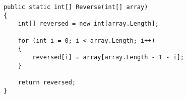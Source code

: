 \begin{lstlisting}
public static int[] Reverse(int[] array)
{
    int[] reversed = new int[array.Length];
    
    for (int i = 0; i < array.Length; i++)
    {
        reversed[i] = array[array.Length - 1 - i];
    }
    
    return reversed;
}
\end{lstlisting}